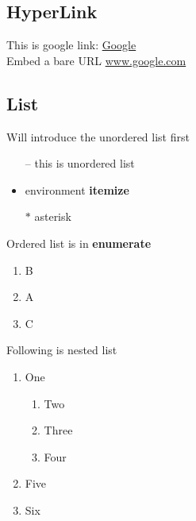 \documentclass{article}
\begin{document}
\subsection{HyperLink}
This is google link: \href{www.google.com}{Google} \\
Embed a bare URL \url{www.google.com}

\subsection{List}
Will introduce the unordered list first
\begin{itemize}
    \item[--] this is unordered list %
    \item environment \textbf{itemize}
    \item[$\ast$] asterisk
\end{itemize}
Ordered list is in \textbf{enumerate}
\begin{enumerate}
    \item B
    \item A
    \item C
\end{enumerate}
Following is nested list
\begin{enumerate}
	\item One
    \begin{enumerate}
    	\item Two
        \item Three
        \item Four
    \end{enumerate}
    \item Five
    \item Six
\end{enumerate}

\newpage



\end{document}
